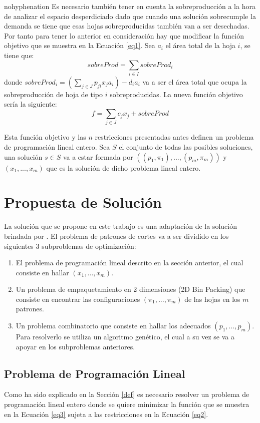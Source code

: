 \documentclass[a4paper,10pt,twocolumn]{article}
\begin{document}
\begin{hyphenrules}{nohyphenation}
Es necesario también tener en cuenta la sobreproducción a la hora de analizar el espacio desperdiciado dado que cuando una solución sobrecumple la demanda se tiene que esas hojas sobreproducidas también van a ser desechadas. Por tanto para tener lo anterior en consideración hay que modificar la función objetivo que se muestra en la Ecuación \eqref{eq1}. Sea $a_i$ el área total de la hoja $i$, se tiene que:
 $$sobreProd = \sum_{i \in I} sobreProd_i $$ 
donde $sobreProd_i = (\sum_{j \in J} p_{ji}x_ja_i)  -  d_ia_i$ va a ser el área total que ocupa la sobreproducción de hoja de tipo $i$ sobreproducidas.
La nueva función objetivo sería la siguiente:
\begin{equation}
f = \sum_{j \in J}c_j x_j + sobreProd
\label{eq3}
\end{equation}

Esta función objetivo y las $n$ restricciones presentadas antes definen un problema de programación lineal entero. Sea $S$ el conjunto de todas las posibles soluciones, una solución $s \in S$ va a estar formada por $((p_1,\pi_1),...,(p_m,\pi_m))$ y $(x_1,...,x_m)$ que es la solución de dicho problema lineal entero.


\section{Propuesta de Solución}\label{prop}
La solución que se propone en este trabajo es una adaptación de la solución brindada por \cite{4}. El problema de patrones de cortes va a ser dividido en los siguientes 3 subproblemas de optimización:
\begin{enumerate}
	\item El problema de programación lineal descrito en la sección anterior, el cual consiste en hallar $(x_1,...,x_m)$.
	\item Un problema de empaquetamiento en 2 dimensiones (2D Bin Packing) que consiste en encontrar las configuraciones $(\pi_1,...,\pi_m)$ de las hojas en los $m$ patrones.
	\item Un problema combinatorio que consiste en hallar los adecuados $(p_1,...,p_m)$. Para resolverlo se utiliza un algoritmo genético, el cual a su vez se va a apoyar en los subproblemas anteriores. 
\end{enumerate}

\subsection{Problema de Programación Lineal}
Como ha sido explicado en la Sección \ref{def} es necesario resolver un problema de programación lineal entero donde se quiere minimizar la función que se muestra en la Ecuación \eqref{eq3} sujeta a las restricciones en la Ecuación \eqref{eq2}.


\end{hyphenrules}
\end{document}
